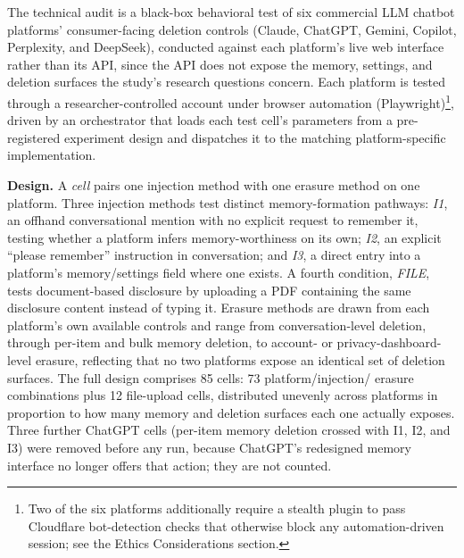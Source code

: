 \documentclass[conference,compsoc]{IEEEtran}
\begin{document}
The technical audit is a black-box behavioral test of six commercial LLM
chatbot platforms' consumer-facing deletion controls (Claude, ChatGPT,
Gemini, Copilot, Perplexity, and DeepSeek), conducted against each
platform's live web interface rather than its API, since the API does
not expose the memory, settings, and deletion surfaces the study's
research questions concern. Each platform is tested through a
researcher-controlled account under browser automation
(Playwright)\footnote{Two of the six platforms additionally require a
stealth plugin to pass Cloudflare bot-detection checks that otherwise
block any automation-driven session; see the Ethics Considerations
section.}, driven by an orchestrator that loads each test cell's
parameters from a pre-registered experiment design and dispatches it to
the matching platform-specific implementation.

\textbf{Design.} A \textit{cell} pairs one injection method with one
erasure method on one platform. Three injection methods test distinct
memory-formation pathways: \textit{I1}, an offhand conversational mention
with no explicit request to remember it, testing whether a platform
infers memory-worthiness on its own; \textit{I2}, an explicit
``please remember'' instruction in conversation; and \textit{I3}, a
direct entry into a platform's memory/settings field where one exists. A
fourth condition, \textit{FILE}, tests document-based disclosure by
uploading a PDF containing the same disclosure content instead of typing
it. Erasure methods are drawn from each platform's own available
controls and range from conversation-level deletion, through per-item and
bulk memory deletion, to account- or privacy-dashboard-level erasure,
reflecting that no two platforms expose an identical set of deletion
surfaces. The full design comprises 85 cells: 73 platform/injection/
erasure combinations plus 12 file-upload cells, distributed unevenly
across platforms in proportion to how many memory and deletion surfaces
each one actually exposes. Three further ChatGPT cells (per-item memory
deletion crossed with I1, I2, and I3) were removed before any run, because
ChatGPT's redesigned memory interface no longer offers that action; they
are not counted.
\end{document}
